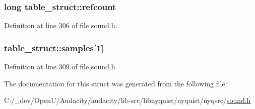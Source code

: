 \subsubsection[{\texorpdfstring{refcount}{refcount}}]{\setlength{\rightskip}{0pt plus 5cm}long table\+\_\+struct\+::refcount}\hypertarget{structtable__struct_a492ae650461bb95519dbdf8a968e08f7}{}\label{structtable__struct_a492ae650461bb95519dbdf8a968e08f7}


Definition at line 306 of file sound.\+h.

\subsubsection[{\texorpdfstring{samples}{samples}}]{ table\+\_\+struct\+::samples\mbox{[}1\mbox{]}}\hypertarget{structtable__struct_af21c66b00f0ce30f3f0b0c7d2405c988}{}\label{structtable__struct_af21c66b00f0ce30f3f0b0c7d2405c988}


Definition at line 309 of file sound.\+h.



The documentation for this struct was generated from the following file\+:\begin{DoxyCompactItemize}
\item 
C\+:/\+\_\+dev/\+Open\+U/\+Audacity/audacity/lib-\/src/libnyquist/nyquist/nyqsrc/\hyperlink{sound_8h}{sound.\+h}\end{DoxyCompactItemize}
